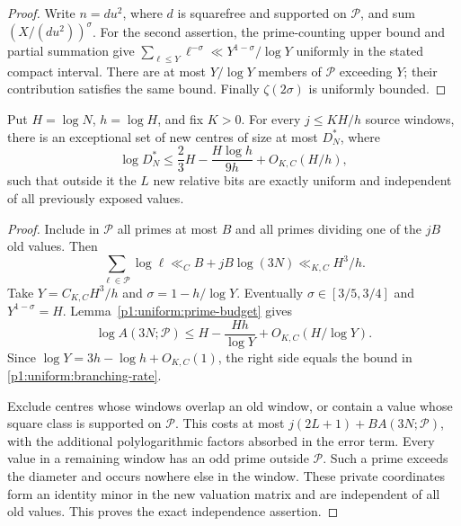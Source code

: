 \begin{proof}
Write \(n=du^2\), where \(d\) is squarefree and
supported on \(\mathcal P\), and sum
\((X/(du^2))^\sigma\).
For the second assertion, the prime-counting
upper bound and partial summation give
\(\sum_{\ell\le Y}\ell^{-\sigma}
\ll Y^{1-\sigma}/\log Y\) uniformly in the stated
compact interval. There are at most \(Y/\log Y\)
members of \(\mathcal P\) exceeding \(Y\);
their contribution satisfies the same bound.
Finally \(\zeta(2\sigma)\) is uniformly bounded.
\end{proof}

\begin{proposition}
\label{p1:uniform:branching}
Put \(H=\log N\), \(h=\log H\), and fix \(K>0\).
For every \(j\le KH/h\) source windows, there is
an exceptional set of new centres of size at most
\(D_N^*\), where
\begin{equation}
 \log D_N^*
 \le\frac23H-\frac{H\log h}{9h}+O_{K,C}(H/h),
 \label{p1:uniform:branching-rate}
\end{equation}
such that outside it the \(L\) new relative bits
are exactly uniform and independent of all
previously exposed values.
\end{proposition}

\begin{proof}
Include in \(\mathcal P\) all primes at most \(B\)
and all primes dividing one of the \(jB\) old
values. Then
\[
 \sum_{\ell\in\mathcal P}\log\ell
       \ll_C B+jB\log(3N)\ll_{K,C}H^3/h.
\]
Take \(Y=C_{K,C}H^3/h\) and
\(\sigma=1-h/\log Y\). Eventually
\(\sigma\in[3/5,3/4]\) and \(Y^{1-\sigma}=H\).
Lemma~\ref{p1:uniform:prime-budget} gives
\[
 \log A(3N;\mathcal P)
 \le H-\frac{Hh}{\log Y}
                       +O_{K,C}(H/\log Y).
\]
Since \(\log Y=3h-\log h+O_{K,C}(1)\), the
right side equals the bound in
\eqref{p1:uniform:branching-rate}.

Exclude centres whose windows overlap an old window,
or contain a value whose square class is supported
on \(\mathcal P\). This costs at most
\(j(2L+1)+BA(3N;\mathcal P)\), with the additional
polylogarithmic factors absorbed in the error term.
Every value in a remaining window has an odd prime
outside \(\mathcal P\). Such a prime exceeds the
diameter and occurs nowhere else in the window.
These private coordinates form an identity minor
in the new valuation matrix and are independent
of all old values. This proves the exact
independence assertion.
\end{proof}

